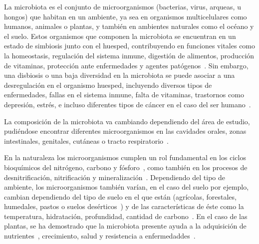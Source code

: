 La microbiota es el conjunto de microorganismos (bacterias, virus, arqueas, u hongos) que habitan en un ambiente, ya sea en organismos multicelulares como humanos, animales o plantas, y también en ambientes naturales como el océano y el suelo. 
Estos organismos que componen la microbiota se encuentran en un estado de simbiosis junto con el huesped, contribuyendo en funciones vitales como la homeostasis, regulación del sistema inmune, digestión de alimentos, producción de vitaminas, protección ante enfermedades y agentes patógenos~\cite{marco2021defining,fijan2014microorganisms,altvecs2020interaction,hou2022microbiota}. 
Sin embargo, una disbiosis o una baja diversidad en la microbiota se puede asociar a una desregulación en el organismo huesped, incluyendo diversos tipos de enfermedades, fallas en el sistema inmune, falta de vitaminas, trastornos como depresión, estrés, e incluso diferentes tipos de cáncer en el caso del ser humano~\cite{altvecs2020interaction,hou2022microbiota}.

La composición de la microbiota va cambiando dependiendo del área de estudio, pudiéndose encontrar diferentes microorganismos en las cavidades orales, zonas intestinales, genitales, cutáneas o tracto respiratorio~\cite{ursell2012interpersonal}.


En la naturaleza los microorganismos cumplen un rol fundamental en los ciclos bioquímicos del nitrógeno, carbono y fósforo~\cite{bitton1994role, gougoulias2014role}, como también en los procesos de desnitrificación, nitrificación y mineralización~\cite{bitton1994role, gougoulias2014role}. 
Dependiendo del tipo de ambiente, los microorganismos también varían, en el caso del suelo por ejemplo, cambian dependiendo del tipo de suelo en el que están (agrícolas, forestales, humedales, pastos o suelos desérticos~\cite{jiao2021linking}) y de las características de éste como la temperatura, hidratación, profundidad, cantidad de carbono~\cite{bickel2020soil}.
En el caso de las plantas, se ha demostrado que la microbiota presente ayuda a la adquisición de nutrientes~\cite{hu2017probiotic}, crecimiento, salud y resistencia a enfermedaddes~\cite{lemanceau2017let,hardoim2015hidden,vorholt2012microbial,COMPANT201929}.


